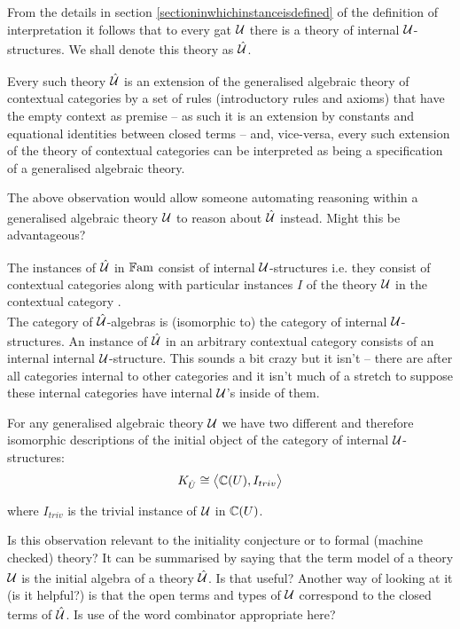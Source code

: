 \note 
From the details  in
section \ref{sectioninwhichinstanceisdefined} 
of the definition of interpretation
it follows that 
to every gat $\gat[U]$ there is a theory of internal $\gat[U]$-structures. We shall denote this theory as $\hatU$.

Every such theory $\hatU$ is an extension of the generalised algebraic theory of contextual categories
by a set of rules (introductory rules and axioms) that have  the empty context as premise -- as such it is an extension
by constants and equational identities between closed terms -- and, vice-versa, every such extension of
the theory of contextual categories can be interpreted as being a specification of a generalised algebraic theory.  

\begin{notebox}[Question]
The above observation would allow someone automating reasoning within  a generalised algebraic theory 
$\gatU$ to reason about $\hatU$ instead. Might this be advantageous? 
\end{notebox}

\note 
The instances of $\hatU$  in $\Fam$ consist of  internal $\gat[U]$-structures  i.e. they consist of contextual categories \catcw along with particular instances $I$ of
the theory $\gat[U]$ in the contextual category \catc. \\
The category of $\hatU$-algebras is (isomorphic to) the category of internal $\gatU$-structures.
\note
An instance of $\hatU$ in an arbitrary contextual category
consists of  an internal internal $\gat[U]$-structure. This sounds a bit crazy but it isn't -- there are after all categories internal to other categories and it isn't much of a stretch to suppose these internal categories have internal $\gat[U]$'s inside of them. 



\note
\label{termmodelEQfreealgebra}For any generalised algebraic theory $\gat[U]$ we have two different 
and therefore isomorphic descriptions of the initial object of the category of internal $\gatU$-structures:\\
\begin{equation}
K_{\hat{U}} \cong \bigtuple{\CofU, I_{triv}}
\end{equation}

where $I_{triv}$ is the trivial instance of $\gatU$ in $\CofU$.

\begin{notebox}[Question]
Is this observation relevant
to the initiality conjecture or to formal (machine checked) theory?  It can be summarised 
by saying that the term model of a theory $\gatU$ is the initial algebra of a theory $\hatU$.
Is that useful? Another way of looking at it (is it helpful?) is that the open terms and types
of $\gatU$ correspond to the closed terms of $\hatU$. 
Is use of the word combinator appropriate here?
\end{notebox}

